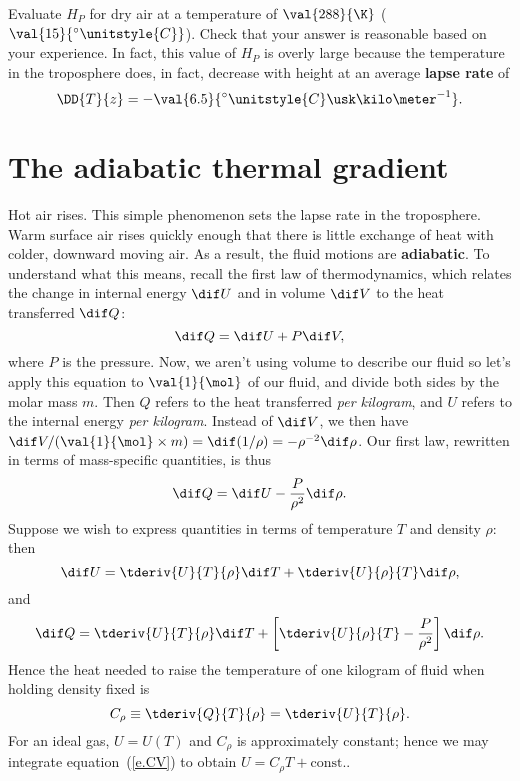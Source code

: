 \begin{exercisebox}
Evaluate $H_{P}$ for dry air at a temperature of $\val{288}{\K}$ ($\val{15}{^{\circ}\unitstyle{C}}$).  Check that your answer is reasonable based on your experience.  In fact, this value of $H_{P}$ is overly large because the temperature in the troposphere does, in fact, decrease with height at an average \textbf{lapse rate} of
\[
	\DD{T}{z} = -\val{6.5}{^{\circ}\unitstyle{C}\usk\kilo\meter^{-1}}.
\]
\end{exercisebox}

\section{The adiabatic thermal gradient}\label{s.adiabatic-gradient}
Hot air rises. This simple phenomenon sets the lapse rate in the troposphere. Warm surface air rises quickly enough that there is little exchange of heat with colder, downward moving air.  As a result, the fluid motions are \textbf{adiabatic}.  To understand what this means, recall the first law of thermodynamics\cite{Fermi1956Thermodynamics}, which relates the change in internal energy $\dif U$ and in volume $\dif V$ to the heat transferred $\dif Q$:
\begin{equation}\label{e.first-law-thermo}
	\dif Q = \dif U + P\dif V,
\end{equation}
where $P$ is the pressure.  Now, we aren't using volume to describe our fluid so let's apply this equation to $\val{1}{\mol}$ of our fluid, and divide both sides by the molar mass $m$.  Then $Q$ refers to the heat transferred \emph{per kilogram}, and $U$ refers to the internal energy \emph{per kilogram}.  Instead of $\dif V$, we then have $\dif V/(\val{1}{\mol}\times m) = \dif(1/\rho) = -\rho^{-2}\dif\rho$.  Our first law, rewritten in terms of mass-specific quantities, is thus
\begin{equation}\label{e.first-law-thermo-astro}
	\dif Q = \dif U -\frac{P}{\rho^{2}}\dif \rho.
\end{equation}
Suppose we wish to express quantities in terms of temperature $T$ and density $\rho$: then
\[ \dif U = \tderiv{U}{T}{\rho}\dif T + \tderiv{U}{\rho}{T}\dif \rho, \]
and
\[ \dif Q = \tderiv{U}{T}{\rho}\dif T + \left[\tderiv{U}{\rho}{T} - \frac{P}{\rho^{2}}\right]\dif \rho. \]
Hence the heat needed to raise the temperature of one kilogram of fluid when holding density fixed is
\begin{equation}\label{e.CV}
C_{\rho} \equiv \tderiv{Q}{T}{\rho} = \tderiv{U}{T}{\rho}.
\end{equation}
For an ideal gas, $U = U(T)$ and $C_{\rho}$ is approximately constant; hence we may integrate equation~(\ref{e.CV}) to obtain $U = C_{\rho}T + \textrm{const.}$.

